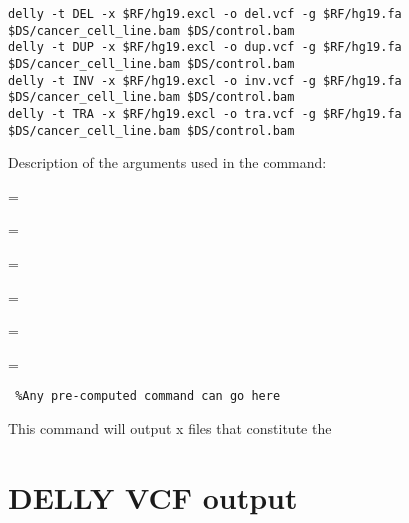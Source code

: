\begin{lstlisting}
delly -t DEL -x $RF/hg19.excl -o del.vcf -g $RF/hg19.fa $DS/cancer_cell_line.bam $DS/control.bam
delly -t DUP -x $RF/hg19.excl -o dup.vcf -g $RF/hg19.fa $DS/cancer_cell_line.bam $DS/control.bam
delly -t INV -x $RF/hg19.excl -o inv.vcf -g $RF/hg19.fa $DS/cancer_cell_line.bam $DS/control.bam
delly -t TRA -x $RF/hg19.excl -o tra.vcf -g $RF/hg19.fa $DS/cancer_cell_line.bam $DS/control.bam

\end{lstlisting}

Description of the arguments used in the command: 
\begin{description}[style=multiline,labelindent=0cm,align=right,leftmargin=\descriptionlabelspace,rightmargin=1.5cm,font=\ttfamily]
  \item[DEL] = 
  \item[DUP] = 
  \item[INV] = 
  \item[TRA] = 
  \item[-o] = 
  \item[-g] = 
\end{description}

\begin{warning}
  \begin{lstlisting}
 %Any pre-computed command can go here
  \end{lstlisting}
\end{warning}

This command will output x files that constitute the 

\section{DELLY VCF output}

